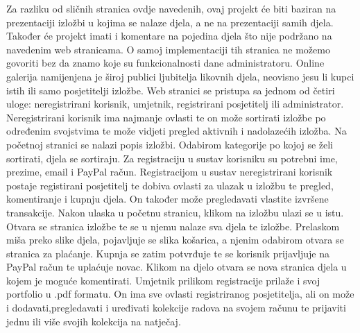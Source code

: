 		\vspace{10mm} 
			
		
		{Za razliku od sličnih stranica ovdje navedenih, ovaj projekt će biti baziran na prezentaciji izložbi u kojima se nalaze djela, a ne na prezentaciji samih djela. 
		Također će projekt 	imati i komentare na pojedina djela što nije podržano na navedenim web stranicama. O samoj implementaciji tih stranica ne možemo govoriti bez da znamo koje su funkcionalnosti dane administratoru.
		\newline Online galerija namijenjena je široj publici ljubitelja likovnih djela, neovisno jesu li kupci istih ili samo posjetitelji izložbe.
		\vspace{3mm}
		\newline Web stranici se pristupa sa jednom od četiri uloge: neregistrirani korisnik, umjetnik, registrirani posjetitelj ili administrator. Neregistrirani korisnik ima najmanje ovlasti te on može  sortirati izložbe po određenim svojstvima te može vidjeti pregled aktivnih i nadolazećih izložba. 
		\newline Na početnoj stranici se nalazi popis izložbi. Odabirom kategorije po kojoj se želi sortirati, djela se sortiraju.
		\newline Za registraciju u sustav korisniku su potrebni ime, prezime, email i PayPal račun.
		\vspace{3mm}
		\newline Registracijom u sustav neregistrirani korisnik postaje registirani posjetitelj te dobiva ovlasti za ulazak u izložbu te pregled, komentiranje i kupnju djela. On također može  pregledavati vlastite izvršene transakcije.
		\newline Nakon ulaska u početnu stranicu, klikom na izložbu ulazi se u istu. Otvara se stranica izložbe te se u njemu nalaze sva djela te izložbe.
		\newline Prelaskom miša preko slike djela, pojavljuje se slika košarica, a njenim odabirom otvara se stranica za plaćanje. Kupnja se zatim potvrđuje te se korisnik prijavljuje na PayPal račun te uplaćuje novac. 
		\newline Klikom na djelo otvara se nova stranica djela u kojem je moguće komentirati. 
		\vspace{3mm}
		\newline Umjetnik prilikom registracije prilaže i svoj portfolio u .pdf formatu. On ima sve ovlasti registriranog posjetitelja, ali on može i dodavati,pregledavati i uređivati kolekcije radova na svojem računu te prijaviti jednu ili više svojih kolekcija na natječaj.
}
